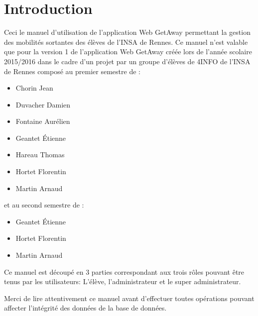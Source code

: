 \chapter{Introduction}

Ceci le manuel d'utilisation de l'application Web GetAway permettant la gestion des mobilités sortantes des élèves de l'INSA de Rennes.
\bigbreak
Ce manuel n'est valable que pour la version 1 de l'application Web GetAway créée lors de l'année scolaire 2015/2016 dans le cadre d'un projet par un groupe d'élèves de 4INFO de l'INSA de Rennes composé au premier semestre de :

\begin{itemize}
	\item Chorin Jean
	\item Duvacher Damien
	\item Fontaine Aurélien
	\item Geantet Étienne
	\item Hareau Thomas
	\item Hortet Florentin
	\item Martin Arnaud
\end{itemize}
\bigbreak

et au second semestre de :

\begin{itemize}
	\item Geantet Étienne
	\item Hortet Florentin
	\item Martin Arnaud
\end{itemize}


Ce manuel est découpé en 3 parties correspondant aux trois rôles pouvant être tenus par les utilisateurs: L'élève, l'administrateur et le super administrateur.

\bigbreak 

\att Merci de lire attentivement ce manuel avant d'effectuer toutes opérations pouvant affecter l'intégrité des données de la base de données.